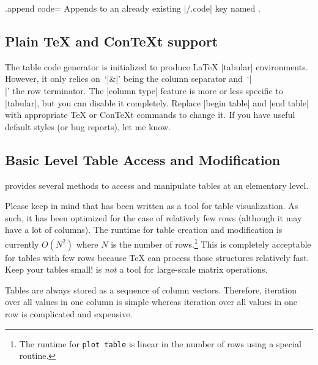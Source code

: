 \documentclass[a4paper]{ltxdoc}
\begin{document}
\begin{handler}{{.append code}=}
    Appends  to an already existing |/.code| key named
    .
\end{handler}



\subsection{Plain \TeX{} and Con\TeX{}t support}
\label{sec:pgfplotstable:context}

The table code generator is initialized to produce \LaTeX{} |tabular|
environments. However, it only relies on~`|&|' being the column separator
and~`|\\|' the row terminator. The |column type| feature is more or less
specific to |tabular|, but you can disable it completely. Replace |begin table|
and |end table| with appropriate \TeX{} or Con\TeX{}t commands to change it. If
you have useful default styles (or bug reports), let me know.


\subsection{Basic Level Table Access and Modification}

\PGFPlotstable{} provides several methods to access and manipulate tables at an
elementary level.

Please keep in mind that \PGFPlotstable{} has been written as a tool for table
visualization. As such, it has been optimized for the case of relatively few
rows (although it may have a lot of columns). The runtime for table creation
and modification is currently $O(N^2)$ where $N$ is the number of
rows.\footnote{The runtime for \texttt{plot table} is linear in the number of
rows using a special routine.} This is completely acceptable for tables with
few rows because \TeX{} can process those structures relatively fast. Keep your
tables small! \PGFPlotstable{} is \emph{not} a tool for large-scale matrix
operations.

Tables are always stored as a sequence of column vectors. Therefore, iteration
over all values in one column is simple whereas iteration over all values in
one row is complicated and expensive.
\end{document}
